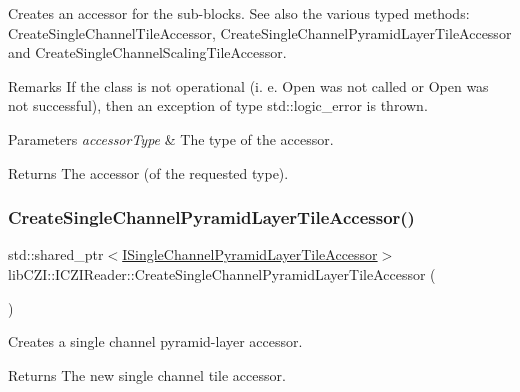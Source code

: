 Creates an accessor for the sub-\/blocks. See also the various typed methods\+: {\ttfamily Create\+Single\+Channel\+Tile\+Accessor}, {\ttfamily Create\+Single\+Channel\+Pyramid\+Layer\+Tile\+Accessor} and {\ttfamily Create\+Single\+Channel\+Scaling\+Tile\+Accessor}. \begin{DoxyRemark}{Remarks}
If the class is not operational (i. e. Open was not called or Open was not successful), then an exception of type std\+::logic\+\_\+error is thrown.
\end{DoxyRemark}

\begin{DoxyParams}{Parameters}
{\em accessor\+Type} & The type of the accessor.\\
\hline
\end{DoxyParams}
\begin{DoxyReturn}{Returns}
The accessor (of the requested type). 
\end{DoxyReturn}
\mbox{\label{classlib_c_z_i_1_1_i_c_z_i_reader_af7f45db86ad27a90394bf036bfa4e985}} 
\subsubsection{\texorpdfstring{Create\+Single\+Channel\+Pyramid\+Layer\+Tile\+Accessor()}{CreateSingleChannelPyramidLayerTileAccessor()}}
{\footnotesize\ttfamily std\+::shared\+\_\+ptr$<$\hyperlink{classlib_c_z_i_1_1_i_single_channel_pyramid_layer_tile_accessor}{I\+Single\+Channel\+Pyramid\+Layer\+Tile\+Accessor}$>$ lib\+C\+Z\+I\+::\+I\+C\+Z\+I\+Reader\+::\+Create\+Single\+Channel\+Pyramid\+Layer\+Tile\+Accessor (\begin{DoxyParamCaption}{ }\end{DoxyParamCaption})\hspace{0.3cm}{\ttfamily [inline]}}

Creates a single channel pyramid-\/layer accessor. \begin{DoxyReturn}{Returns}
The new single channel tile accessor. 
\end{DoxyReturn}
\mbox{\label{classlib_c_z_i_1_1_i_c_z_i_reader_a481f10b35f8f9e8afa05b0e0a3f94d59}} 
